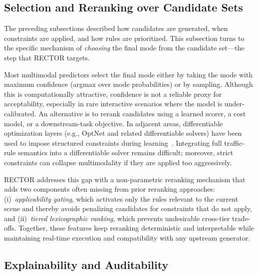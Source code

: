 \subsection{Selection and Reranking over Candidate Sets}
\label{subsec:selection_reranking}

The preceding subsections described how candidates are generated, when constraints are applied, and how rules are prioritized.  This subsection turns to the specific mechanism of \emph{choosing} the final mode from the candidate set---the step that RECTOR targets.

Most multimodal predictors select the final mode either by taking the mode with maximum confidence (argmax over mode probabilities) or by sampling.  Although this is computationally attractive, confidence is not a reliable proxy for acceptability, especially in rare interactive scenarios where the model is under-calibrated.  An alternative is to rerank candidates using a learned scorer, a cost model, or a downstream-task objective.  In adjacent areas, differentiable optimization layers (e.g., OptNet and related differentiable solvers) have been used to impose structured constraints during learning~\cite{amos2017optnet,amos2018differentiable}.  Integrating full traffic-rule semantics into a differentiable solver remains difficult; moreover, strict constraints can collapse multimodality if they are applied too aggressively.

RECTOR addresses this gap with a non-parametric reranking mechanism that adds two components often missing from prior reranking approaches: (i)~\textit{applicability gating}, which activates only the rules relevant to the current scene and thereby avoids penalizing candidates for constraints that do not apply, and (ii)~\textit{tiered lexicographic ranking}, which prevents undesirable cross-tier trade-offs.  Together, these features keep reranking deterministic and interpretable while maintaining real-time execution and compatibility with any upstream generator.

\subsection{Explainability and Auditability}
\label{subsec:explainability_auditability}

